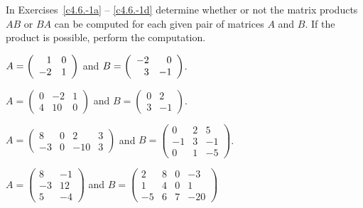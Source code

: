 \noindent In Exercises~\ref{c4.6.-1a} -- \ref{c4.6.-1d} determine whether or 
not the matrix products $AB$ or $BA$ can be computed for each given pair of 
matrices $A$ and $B$.  If the product is possible, perform the computation.
\begin{exercise}  \label{c4.6.-1a}
$A=\left(\begin{array}{rr} 1 & 0\\ -2 &1\end{array}\right)$ and $B=\left(\begin{array}{rr} -2 & 0\\ 3 &-1\end{array}\right)$.
\end{exercise}
\begin{exercise}  \label{c4.6.-1b}
$A=\left(\begin{array}{rrr} 0 & -2 & 1\\ 4 & 10 & 0 \end{array}\right)$
and $B=\left(\begin{array}{rr} 0 & 2 \\ 3 & -1 \end{array}\right)$.
\end{exercise}
\begin{exercise}  \label{c4.6.-1c}
$A=\left(\begin{array}{rrrr} 8 & 0 & 2 & 3\\ -3 & 0 & -10 &
3\end{array}\right)$
and $B=\left(\begin{array}{rrr} 0 & 2 & 5\\ -1 & 3 & -1 \\ 0 & 1 &
-5\end{array}\right)$.
\end{exercise}
\begin{exercise}  \label{c4.6.-1d}
$A=\left(\begin{array}{rr} 8 & -1 \\ -3 & 12 \\ 5 & -4\end{array}\right)$
and $B=\left(\begin{array}{rrrr} 2 & 8 & 0 & -3\\ 1 & 4 & 0 & 1\\
-5 & 6 & 7 & -20\end{array}\right)$
\end{exercise}


